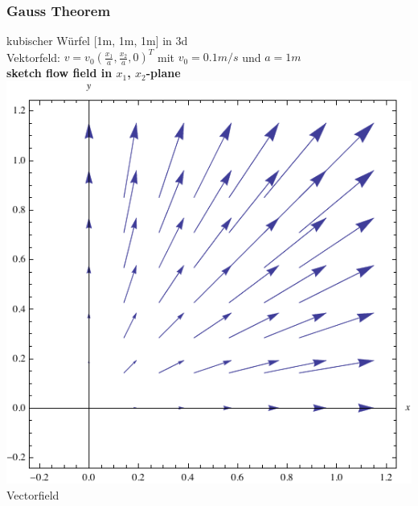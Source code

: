 	\subsubsection{Gauss Theorem}
	kubischer Würfel [1m, 1m, 1m] in 3d\\
	Vektorfeld: $v = v_0 (\frac{x_1}{a}, \frac{x_2}{a}, 0)^T$ mit $v_0 = 0.1 m/s$
	und $a = 1m$\\
	
	\textbf{sketch flow field in $x_1$, $x_2$-plane}\\
	
	\includegraphics[scale=0.5]{images/gauss.pdf}\\ %
	Vectorfield\\
	
